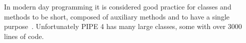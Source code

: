 In modern day programming it is considered good practice for classes and methods to be short, composed of auxiliary methods and to have a single purpose~\cite{so_can_a_function_be_too_short}. Unfortunately PIPE 4 has many large classes, some with over \num{3000} lines of code. 


